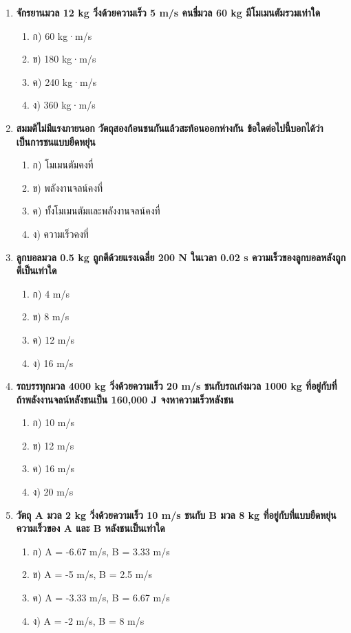 \documentclass[12pt]{article}
\begin{document}
\begin{enumerate}
\begin{enumerate}
\item ง) 4 m/s
\end{enumerate}
\item \textbf{จักรยานมวล 12 kg วิ่งด้วยความเร็ว 5 m/s คนขี่มวล 60 kg มีโมเมนตัมรวมเท่าใด}
\begin{enumerate}
\item ก) 60 kg·m/s
\item ข) 180 kg·m/s
\item ค) 240 kg·m/s
\item ง) 360 kg·m/s
\end{enumerate}
\item \textbf{สมมติไม่มีแรงภายนอก วัตถุสองก้อนชนกันแล้วสะท้อนออกห่างกัน ข้อใดต่อไปนี้บอกได้ว่าเป็นการชนแบบยืดหยุ่น}
\begin{enumerate}
\item ก) โมเมนตัมคงที่
\item ข) พลังงานจลน์คงที่
\item ค) ทั้งโมเมนตัมและพลังงานจลน์คงที่
\item ง) ความเร็วคงที่
\end{enumerate}
\item \textbf{ลูกบอลมวล 0.5 kg ถูกตีด้วยแรงเฉลี่ย 200 N ในเวลา 0.02 s ความเร็วของลูกบอลหลังถูกตีเป็นเท่าใด}
\begin{enumerate}
\item ก) 4 m/s
\item ข) 8 m/s
\item ค) 12 m/s
\item ง) 16 m/s
\end{enumerate}
\item \textbf{รถบรรทุกมวล 4000 kg วิ่งด้วยความเร็ว 20 m/s ชนกับรถเก๋งมวล 1000 kg ที่อยู่กับที่ ถ้าพลังงานจลน์หลังชนเป็น 160,000 J จงหาความเร็วหลังชน}
\begin{enumerate}
\item ก) 10 m/s
\item ข) 12 m/s
\item ค) 16 m/s
\item ง) 20 m/s
\end{enumerate}
\item \textbf{วัตถุ A มวล 2 kg วิ่งด้วยความเร็ว 10 m/s ชนกับ B มวล 8 kg ที่อยู่กับที่แบบยืดหยุ่น ความเร็วของ A และ B หลังชนเป็นเท่าใด}
\begin{enumerate}
\item ก) A = -6.67 m/s, B = 3.33 m/s
\item ข) A = -5 m/s, B = 2.5 m/s
\item ค) A = -3.33 m/s, B = 6.67 m/s
\item ง) A = -2 m/s, B = 8 m/s
\end{enumerate}
\end{enumerate}
\end{document}
